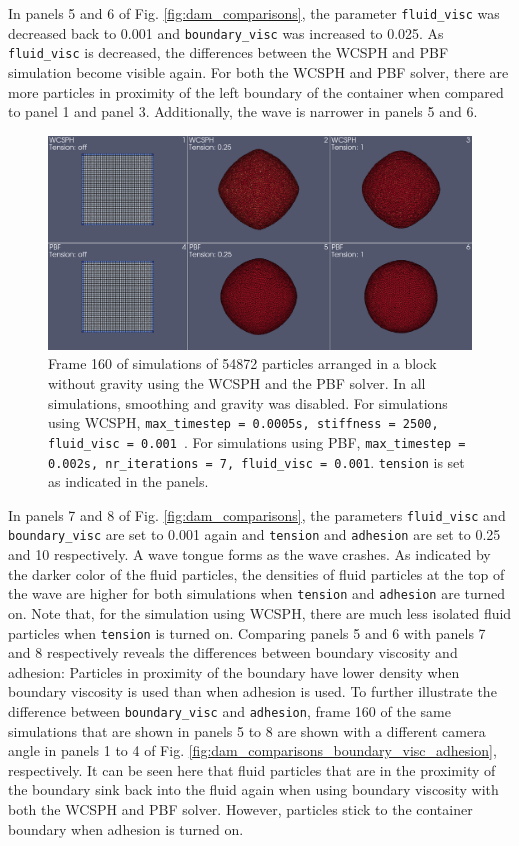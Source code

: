 \documentclass[11pt, letterpaper, twocolumn]{article}
\begin{document}
In panels 5 and 6 of Fig. \ref{fig:dam_comparisons}, the parameter \texttt{fluid\_visc} was decreased back to 0.001 and \texttt{boundary\_visc} was increased to 0.025.
As \texttt{fluid\_visc} is decreased, the differences between the WCSPH and PBF simulation become visible again.
For both the WCSPH and PBF solver,  there are more particles in proximity of the left boundary of the container when compared to panel 1 and panel 3. Additionally, the wave is narrower in panels 5 and 6. 

\begin{figure}[!b]
  \centering
  \includegraphics[width=\textwidth]{images/tension.0053.png}
  \caption{Frame 160 of simulations of 54872 particles arranged in a block without gravity using the WCSPH and the PBF solver. In all simulations, smoothing and gravity was disabled. For simulations using WCSPH, \texttt{max\_timestep = 0.0005s, stiffness = 2500, fluid\_visc = 0.001 }. 
  For simulations using PBF, \texttt{max\_timestep = 0.002s, nr\_iterations = 7, fluid\_visc = 0.001}. \texttt{tension} is set as indicated in the panels.}
  \label{fig:tension}
\end{figure}

In panels 7 and 8 of Fig. \ref{fig:dam_comparisons}, the parameters \texttt{fluid\_visc} and \texttt{boundary\_visc} are set to 0.001 again and \texttt{tension} and \texttt{adhesion} are set to 0.25 and 10 respectively. A wave tongue forms as the wave crashes. As indicated by the darker color of the fluid particles,  the densities of fluid particles at the top of the wave are higher for both simulations  when \texttt{tension} and \texttt{adhesion} are turned on.
Note that, for the simulation using WCSPH, there are much less isolated fluid particles when \texttt{tension} is turned on. Comparing panels 5 and 6 with panels 7 and 8 respectively reveals the 
differences between boundary viscosity and adhesion: Particles in proximity of the boundary have lower density when boundary viscosity is used than when adhesion is used.
To further illustrate the difference between \texttt{boundary\_visc} and \texttt{adhesion}, frame 160 of the same simulations that are shown in panels 5 to 8 are shown with a
different camera angle in panels 1 to 4 of Fig. \ref{fig:dam_comparisons_boundary_visc_adhesion}, respectively. It can be seen here that fluid particles that are in the proximity of the boundary sink back into the fluid again when using boundary viscosity with both the WCSPH and PBF solver. However, particles stick to the container boundary when adhesion is turned on. 
\end{document}

